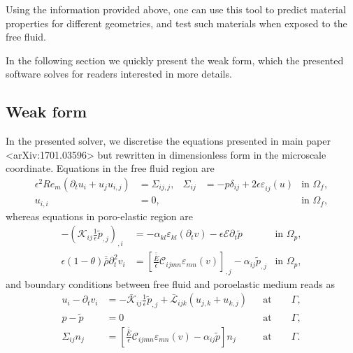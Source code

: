 \documentclass[12pt,a4paper]{article}
\newcommand{\pdt}{\partial_t}
\newcommand{\str}[3]{\varepsilon^{#1}_{#2} \left( #3 \right)}
\newcommand{\ord}{\epsilon}
\begin{document}
Using the information provided above, one can use this tool to predict material properties for different geometries, and test such materials when exposed to the free fluid.

In the following section we quickly present the weak form, which the presented software solves for readers interested in more details.

\subsection{Weak form}

In the presented solver, we discretise the equations presented in main paper <arXiv:1701.03596> but rewritten in dimensionless form in the microscale coordinate. Equations in the free fluid region are
\begin{align}
\ord^2 Re_m \left( \pdt u_i  + u_j u_{i,j} \right) & = \Sigma_{ij,j}, &  \Sigma_{ij} & = -p \delta_{ij} + 2 \ord \str{}{ij}{u}  & \mbox{in } \Omega_f, \\
u_{i,i} & = 0, & &  & \mbox{in } \Omega_f, 
\end{align}
whereas equations in poro-elastic region are
\begin{align}
- \left( \mathcal{K}_{ij} \frac{1}{\ord} \tilde{p}_{,j} \right)_{,i} & = - \alpha_{kl} \str{}{kl}{ \pdt v }  - \ord \mathcal{E} \pdt \tilde{p}   & \mbox{in } \Omega_p,\\
\ord \left(1 - \theta \right) \bar{\bar{\rho}} \pdt^2 v_i & = \left[ \frac{\bar{\bar{E}}}{\ord} \mathcal{C}_{ijmn} \str{}{mn}{ v } \right]_{,j} - \alpha_{ij} \tilde{p}_{,j}   & \mbox{in } \Omega_p,
\end{align}
and boundary conditions between free fluid and poroelastic medium reads as
\begin{align}
u_i - \pdt v_i & =  - \mathcal{\bar{K}}_{ij} \frac{1}{\ord} \tilde{p}_{,j} + \mathcal{\bar{L}}_{ijk} \left( u_{j,k} + u_{k,j} \right)  & & \textrm{at}\qquad \Gamma, \\
p - \tilde{p} & = 0  & & \textrm{at}\qquad \Gamma, \\
\Sigma_{ij} n_j & = \left[ \frac{\bar{\bar{E}}}{\ord} \mathcal{C}_{ijmn} \str{}{mn}{ v } - \alpha_{ij} \tilde{p} \right] n_j  & & \textrm{at}\qquad \Gamma.
\end{align}
\end{document}

